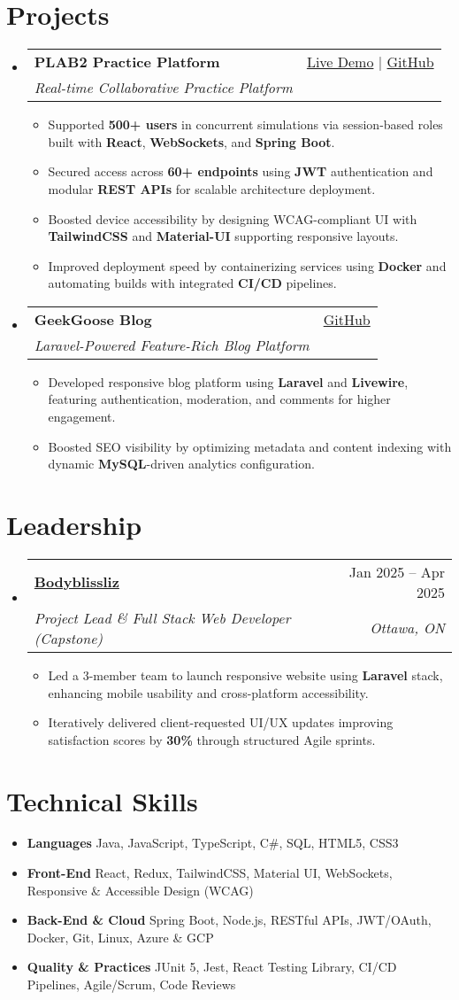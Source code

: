 \documentclass[letterpaper,10pt]{article}
\makeatletter
\newcommand{\resumeItem}[1]{\item\small{#1 \vspace{-2pt}}}
\newcommand{\resumeSubheading}[4]{
  \vspace{-1pt}\item
    \begin{tabular*}{0.97\textwidth}[t]{l@{\extracolsep{\fill}}r}
      \textbf{#1} & #2 \\
      \textit{\small#3} & \textit{\small #4} \\
    \end{tabular*}\vspace{-5pt}
}
\newcommand{\resumeSubHeadingListStart}{\begin{itemize}[leftmargin=*]}
\newcommand{\resumeSubHeadingListEnd}{\end{itemize}}
\newcommand{\resumeItemListStart}{\begin{itemize}}
\newcommand{\resumeItemListEnd}{\end{itemize}\vspace{-5pt}}
\makeatother
\begin{document}
\section{Projects}
  \resumeSubHeadingListStart
    \resumeSubheading
      {\textbf{PLAB2 Practice Platform}}{\href{https://plab2practice.com}{Live Demo} | \href{https://github.com/altansaid/plab2projectnew}{GitHub}}
      {Real-time Collaborative Practice Platform}{}
      \resumeItemListStart
        \resumeItem{Supported \textbf{500+ users} in concurrent simulations via session-based roles built with \textbf{React}, \textbf{WebSockets}, and \textbf{Spring Boot}.}
        \resumeItem{Secured access across \textbf{60+ endpoints} using \textbf{JWT} authentication and modular \textbf{REST APIs} for scalable architecture deployment.}
        \resumeItem{Boosted device accessibility by designing WCAG-compliant UI with \textbf{TailwindCSS} and \textbf{Material-UI} supporting responsive layouts.}
        \resumeItem{Improved deployment speed by containerizing services using \textbf{Docker} and automating builds with integrated \textbf{CI/CD} pipelines.}
      \resumeItemListEnd

    \resumeSubheading
      {\textbf{GeekGoose Blog}}{\href{https://github.com/altansaid/geekgoose}{GitHub}}
      {Laravel-Powered Feature-Rich Blog Platform}{}
      \resumeItemListStart
        \resumeItem{Developed responsive blog platform using \textbf{Laravel} and \textbf{Livewire}, featuring authentication, moderation, and comments for higher engagement.}
        \resumeItem{Boosted SEO visibility by optimizing metadata and content indexing with dynamic \textbf{MySQL}-driven analytics configuration.}
      \resumeItemListEnd
  \resumeSubHeadingListEnd

\section{Leadership}
  \resumeSubHeadingListStart
    \resumeSubheading
      {\href{https://www.bodyblissliz.com}{Bodyblissliz}}{Jan 2025 -- Apr 2025}
      {Project Lead \& Full Stack Web Developer (Capstone)}{Ottawa, ON}
      \resumeItemListStart
        \resumeItem{Led a 3-member team to launch responsive website using \textbf{Laravel} stack, enhancing mobile usability and cross-platform accessibility.}
        \resumeItem{Iteratively delivered client-requested UI/UX updates improving satisfaction scores by \textbf{30\%} through structured Agile sprints.}
      \resumeItemListEnd
  \resumeSubHeadingListEnd

\section{Technical Skills}
  \resumeItemListStart
    \resumeItem{\textbf{Languages}}{Java, JavaScript, TypeScript, C\#, SQL, HTML5, CSS3}
    \resumeItem{\textbf{Front-End}}{React, Redux, TailwindCSS, Material UI, WebSockets, Responsive \& Accessible Design (WCAG)}
    \resumeItem{\textbf{Back-End \& Cloud}}{Spring Boot, Node.js, RESTful APIs, JWT/OAuth, Docker, Git, Linux, Azure \& GCP}
    \resumeItem{\textbf{Quality \& Practices}}{JUnit 5, Jest, React Testing Library, CI/CD Pipelines, Agile/Scrum, Code Reviews}
  \resumeItemListEnd
\end{document}
